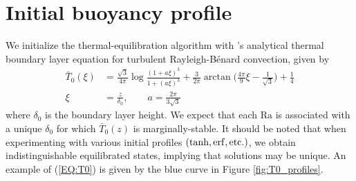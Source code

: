 \documentclass[reprint,amsmath,amssymb,aps]{revtex4-1}
\newcommand\Ra{\mathrm{Ra}}
\newcommand{\eq}[1]{(\ref{#1})}
\begin{document}
\section{Initial buoyancy profile} \label{sec:initial_profile}
We initialize the thermal-equilibration algorithm with \cite{Shishkina}'s analytical thermal boundary layer equation for turbulent Rayleigh-B\'enard convection, given by 
\begin{align}
    \bar{T}_0(\xi) &= \frac{\sqrt{3}}{4\pi} \log \frac{(1 + a\xi)^3}{1 + (a\xi)^3} + \frac{3}{2\pi} \arctan \Big( \frac{4\pi}{9}\xi - \frac{1}{\sqrt{3}} \Big) + \frac{1}{4} \nonumber \\
    \xi &= \frac{z}{\delta_0}, \qquad a = \frac{2\pi}{3\sqrt{3}}\label{EQ:T0}
\end{align}
where $\delta_0$ is the boundary layer height. 
We expect that each $\Ra$ is associated with a unique $\delta_0$ for which $\bar{T}_0(z)$ is marginally-stable. 
It should be noted that when experimenting with various initial profiles $(\tanh, \rm{erf}, \rm{etc.})$, we obtain indistinguishable equilibrated states, implying that solutions may be unique. 
An example of \eq{EQ:T0} is given by the blue curve in Figure \ref{fig:T0_profiles}.

\end{document}

